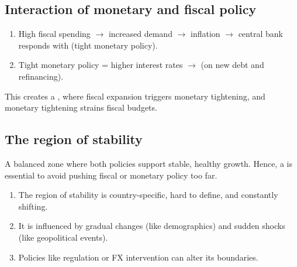 \begin{cifigblock}
{\par}
\end{cifigblock}

\subsection*{Interaction of monetary and fiscal policy}

\begin{enumerate}
\item High fiscal spending $\rightarrow$ increased demand $\rightarrow$ inflation
$\rightarrow$ central bank responds with  (tight monetary policy).
\item Tight monetary policy = higher interest rates $\rightarrow$  (on new debt and refinancing).
\end{enumerate}

This creates a , where fiscal expansion triggers monetary
tightening, and monetary tightening strains fiscal budgets.

\subsection*{The region of stability}

\begin{cidefbox}[title={Region of stability}]
A balanced zone where both policies support stable, healthy growth. Hence, a  is essential to avoid pushing fiscal or monetary policy too far.
\end{cidefbox}

\begin{enumerate}[label=\textbf{\alph*)}]
\item The region of stability is country-specific, hard to define, and constantly shifting.
\item It is influenced by gradual changes (like demographics) and sudden shocks (like
geopolitical events).
\item Policies like regulation or FX intervention can alter its boundaries.
\end{enumerate}

